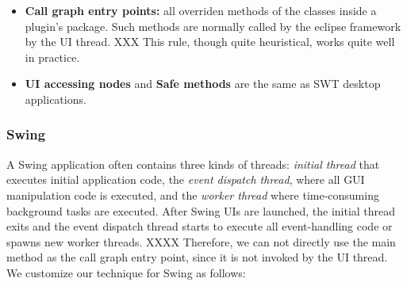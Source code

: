 \begin{itemize}

\item \textbf{Call graph entry points: } all overriden methods of the classes inside
 a plugin's  package.  Such methods are normally called by the eclipse framework
by the UI thread. XXX This rule, though quite heuristical, works quite well in practice.

\item \textbf{UI accessing nodes} and \textbf{Safe methods} are the same as SWT desktop applications.

\end{itemize}

\subsubsection{Swing}



A Swing application often contains three kinds of threads: \textit{initial thread}
that executes initial application code, the \textit{event dispatch thread},
where all GUI manipulation code is executed, and the \textit{worker thread} where
time-consuming background tasks are executed. After Swing UIs are launched,
the initial thread exits and the event dispatch thread starts to execute all
event-handling code or spawns new worker threads. XXXX Therefore, we can not directly
use the main method as the call graph entry point, since it is not invoked
by the UI thread. We customize our technique for Swing as follows:

